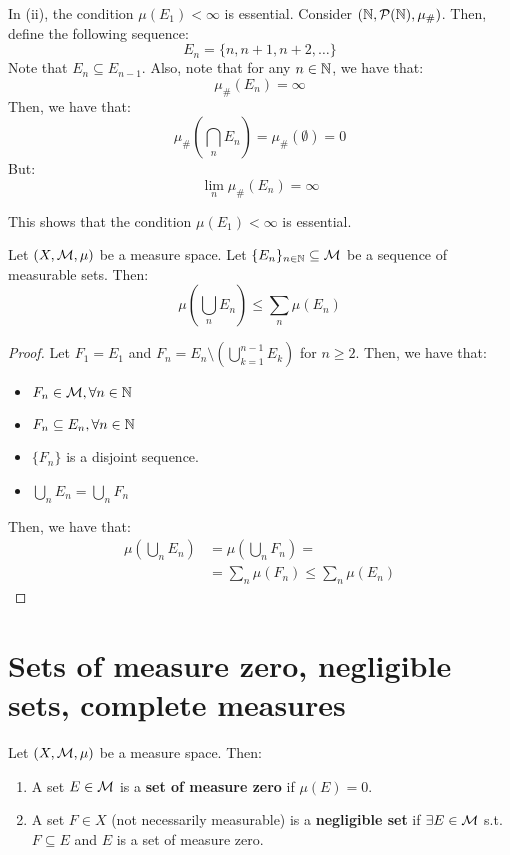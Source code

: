 \begin{fremark}
    In (ii), the condition $\mu(E_1) < \infty$ is essential. Consider $(\mathbb{N}, \mathcal{P}(\mathbb{N}), \mu_{\#})$.
    Then, define the following sequence:
    $$E_n = \{n, n+1, n+2, \ldots\}$$
    Note that $E_n \subseteq E_{n-1}$. Also, note that for any $n \in \mathbb{N}$, we have that:
    $$\mu_{\#}(E_n) = \infty$$
    Then, we have that:
    $$\mu_{\#}\left( \bigcap_{n} E_n \right) = \mu_{\#}(\emptyset) = 0$$
    But:
    $$\lim_{n} \mu_{\#}(E_n) = \infty$$

    This shows that the condition $\mu(E_1) < \infty$ is essential.
\end{fremark}

\vspace{1em}

\begin{ftheorem}
    Let $(X, \mathcal{M}, \mu)$ be a measure space. Let $\{E_n\}_{n \in \mathbb{N}} \subseteq \mathcal{M}$ be a sequence of
    measurable sets. Then:
    $$\mu\left( \bigcup_{n} E_n \right) \leq \sum_{n} \mu(E_n)$$
\end{ftheorem}

\begin{proof}
    Let $F_1 = E_1$ and $F_n = E_n \setminus \left( \bigcup_{k=1}^{n-1} E_k \right)$ for $n \geq 2$.
    Then, we have that:
    \begin{itemize}
        \item $F_n \in \mathcal{M}, \forall n \in \mathbb{N}$
        \item $F_n \subseteq E_n, \forall n \in \mathbb{N}$
        \item $\{F_n\}$ is a disjoint sequence.
        \item $\bigcup_{n} E_n = \bigcup_{n} F_n$
    \end{itemize}

    Then, we have that:
    \begin{align*}
        \mu\left( \bigcup_{n} E_n \right) &= \mu\left( \bigcup_{n} F_n \right) =\\
        &=\sum_{n} \mu(F_n) \leq \sum_{n} \mu(E_n)
    \end{align*}

\end{proof}

\section{Sets of measure zero, negligible sets, complete measures}

\begin{fdefinition}
    Let $(X, \mathcal{M}, \mu)$ be a measure space. Then:
    \vspace{1em}
    \begin{enumerate}
        \item A set $E \in \mathcal{M}$ is a \textbf{set of measure zero} if $\mu(E) = 0$.
        \vspace{1em}
        \item A set $F \in X$ (not necessarily measurable) is a \textbf{negligible set} if $\exists E \in \mathcal{M}$ s.t.
        $F \subseteq E$ and $E$ is a set of measure zero.
    \end{enumerate}
\end{fdefinition}

